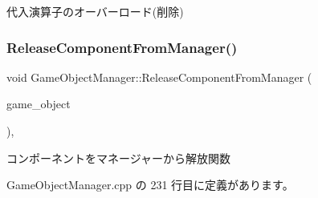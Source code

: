 代入演算子のオーバーロード(削除) 

\mbox{\label{class_game_object_manager_a3435fd94a3a7b9eb69f422e33848137a}} 
\subsubsection{\texorpdfstring{Release\+Component\+From\+Manager()}{ReleaseComponentFromManager()}}
{\footnotesize\ttfamily void Game\+Object\+Manager\+::\+Release\+Component\+From\+Manager (\begin{DoxyParamCaption}\item[{\mbox{\hyperlink{class_game_object_base}{Game\+Object\+Base}} $\ast$}]{game\+\_\+object }\end{DoxyParamCaption})\hspace{0.3cm}{\ttfamily [static]}, {\ttfamily [private]}}



コンポーネントをマネージャーから解放関数 



 Game\+Object\+Manager.\+cpp の 231 行目に定義があります。

